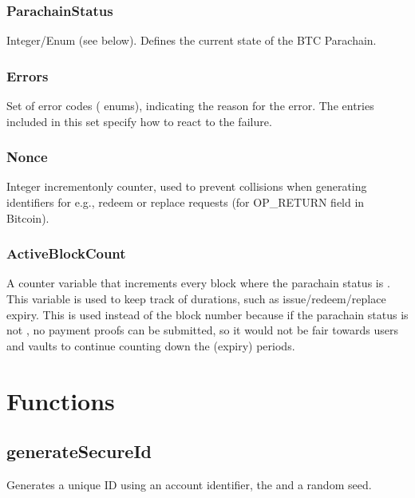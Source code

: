 \documentclass[a4paper,10pt,english]{sphinxmanual}
\begin{document}
\subsubsection{ParachainStatus}
\label{\detokenize{spec/security:parachainstatus}}
Integer/Enum (see  below). Defines the current state of the BTC Parachain.


\subsubsection{Errors}
\label{\detokenize{spec/security:errors}}
Set of error codes ( enums), indicating the reason for the error. The  entries included in this set specify how to react to the failure.


\subsubsection{Nonce}
\label{\detokenize{spec/security:nonce}}
Integer increment\sphinxhyphen{}only counter, used to prevent collisions when generating identifiers for e.g., redeem or replace requests (for OP\_RETURN field in Bitcoin).


\subsubsection{ActiveBlockCount}
\label{\detokenize{spec/security:activeblockcount}}\label{\detokenize{spec/security:id2}}
A counter variable that increments every block where the parachain status is . This variable is used to keep track of durations, such as issue/redeem/replace expiry. This is used instead of the block number because if the parachain status is not , no payment proofs can be submitted, so it would not be fair towards users and vaults to continue counting down the (expiry) periods.


\section{Functions}
\label{\detokenize{spec/security:functions}}

\subsection{generateSecureId}
\label{\detokenize{spec/security:generatesecureid}}\label{\detokenize{spec/security:id3}}
Generates a unique ID using an account identifier, the  and a random seed.
\end{document}
